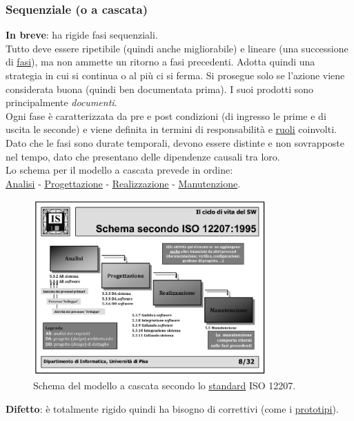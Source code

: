 			\subsubsection{Sequenziale (o a cascata)}  \label{msequenziale}
			\textbf{In breve}: ha rigide fasi sequenziali. \\
			Tutto deve essere ripetibile (quindi anche migliorabile) e lineare (una successione di \underline{\hyperref[fase]{fasi}}), ma non ammette un ritorno a fasi precedenti. Adotta quindi una strategia in cui si continua o al più ci si ferma.
			Si prosegue solo se l'azione viene considerata buona (quindi ben documentata prima). I suoi prodotti sono principalmente \textit{documenti}. \\
			Ogni fase è caratterizzata da pre e post condizioni (di ingresso le prime e di uscita le seconde) e viene definita in termini di responsabilità e \underline{\hyperref[ruoli]{ruoli}} coinvolti.
			Dato che le fasi sono durate temporali, devono essere distinte e non sovrapposte nel tempo, dato che presentano delle dipendenze causali tra loro. \\
			Lo schema per il modello a cascata prevede in ordine:\\
			\underline{\hyperref[analisideirequisiti]{Analisi}} - \underline{\hyperref[progettazione]{Progettazione}} - \underline{\hyperref[realizzazione]{Realizzazione}} - \underline{\hyperref[manutenzione]{Manutenzione}}.  \\

			\begin{figure}[H]
				\centering
				\includegraphics[width=0.8\textwidth]{img/cascata}
				\caption{Schema del modello a cascata secondo lo \underline{\hyperref[standard]{standard}} ISO 12207.}
			\end{figure}
			\textbf{Difetto}: è totalmente rigido quindi ha bisogno di correttivi (come i \underline{\hyperref[prototipo]{prototipi}}).

